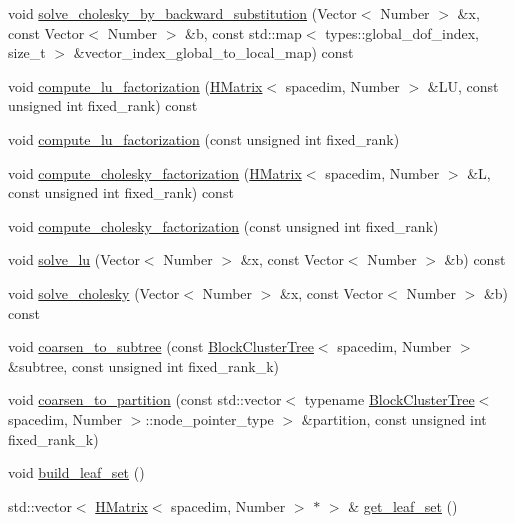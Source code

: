 \begin{DoxyCompactItemize}
\item 
void \hyperlink{classHMatrix_a8dcb361dfb254ff716755ba8b7ed9cf1}{solve\+\_\+cholesky\+\_\+by\+\_\+backward\+\_\+substitution} (Vector$<$ Number $>$ \&x, const Vector$<$ Number $>$ \&b, const std\+::map$<$ types\+::global\+\_\+dof\+\_\+index, size\+\_\+t $>$ \&vector\+\_\+index\+\_\+global\+\_\+to\+\_\+local\+\_\+map) const
\item 
void \hyperlink{classHMatrix_acf95fce81ec83a759d1db8d10c3e34fb}{compute\+\_\+lu\+\_\+factorization} (\hyperlink{classHMatrix}{H\+Matrix}$<$ spacedim, Number $>$ \&LU, const unsigned int fixed\+\_\+rank) const
\item 
void \hyperlink{classHMatrix_aba14c63550f42d8a971beab340337b0e}{compute\+\_\+lu\+\_\+factorization} (const unsigned int fixed\+\_\+rank)
\item 
void \hyperlink{classHMatrix_a7d6c76f7db2b9239f24df292e945a970}{compute\+\_\+cholesky\+\_\+factorization} (\hyperlink{classHMatrix}{H\+Matrix}$<$ spacedim, Number $>$ \&L, const unsigned int fixed\+\_\+rank) const
\item 
void \hyperlink{classHMatrix_abc6e787e46fb082579b2d3aea1ad54f6}{compute\+\_\+cholesky\+\_\+factorization} (const unsigned int fixed\+\_\+rank)
\item 
void \hyperlink{classHMatrix_a83e9dd55091e7eaed11ffb803321c49d}{solve\+\_\+lu} (Vector$<$ Number $>$ \&x, const Vector$<$ Number $>$ \&b) const
\item 
void \hyperlink{classHMatrix_ac5582db8445ec15c69bc4bfdda19d547}{solve\+\_\+cholesky} (Vector$<$ Number $>$ \&x, const Vector$<$ Number $>$ \&b) const
\item 
void \hyperlink{classHMatrix_a27c7390b792e6e47ab2861616a997d99}{coarsen\+\_\+to\+\_\+subtree} (const \hyperlink{classBlockClusterTree}{Block\+Cluster\+Tree}$<$ spacedim, Number $>$ \&subtree, const unsigned int fixed\+\_\+rank\+\_\+k)
\item 
void \hyperlink{classHMatrix_a525ad4d453f4f496b98cccb341c8b60b}{coarsen\+\_\+to\+\_\+partition} (const std\+::vector$<$ typename \hyperlink{classBlockClusterTree}{Block\+Cluster\+Tree}$<$ spacedim, Number $>$\+::node\+\_\+pointer\+\_\+type $>$ \&partition, const unsigned int fixed\+\_\+rank\+\_\+k)
\item 
void \hyperlink{classHMatrix_a139f32982527ba981e0211b5663e3b43}{build\+\_\+leaf\+\_\+set} ()
\item 
std\+::vector$<$ \hyperlink{classHMatrix}{H\+Matrix}$<$ spacedim, Number $>$ $\ast$ $>$ \& \hyperlink{classHMatrix_ac5c9102fc04997c1ae3627185379d9bb}{get\+\_\+leaf\+\_\+set} ()

\end{DoxyCompactItemize}
